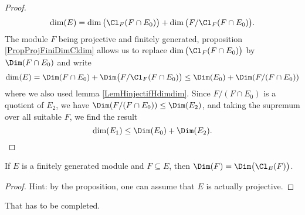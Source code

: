 \begin{proof}
\begin{equation}
	\dim(E)=\dim\big( \Cl_F(F\cap E_0) \big)+\dim\big( F/\Cl_F(F\cap E_0) \big).
\end{equation}
The module $F$ being projective and finitely generated, proposition \ref{PropProjFiniDimCldim} allows us to replace $\dim\big( \Cl_F(F\cap E_0) \big)$ by $\Dim(F\cap E_0)$ and write
\begin{equation}
	\dim(E)=\Dim(F\cap E_0)+\Dim\big( F/\Cl_F(F\cap E_0) \big)\leq \Dim(E_0)+\Dim(F/(F\cap E_0))
\end{equation}
where we also used lemma \ref{LemHinjectifHdimdim}. Since $F/(F\cap E_0)$ is a quotient of $E_2$, we have $\Dim(F/(F\cap E_0))\leq\Dim(E_2)$, and taking the supremum over all suitable $F$, we find the result
\begin{equation}
	\dim(E_1)\leq \Dim(E_0)+\Dim(E_2).
\end{equation}
\end{proof}

\begin{proposition}
If $E$ is a finitely generated module and $F\subseteq E$, then $\Dim(F)=\Dim\big(\Cl_E(F)\big)$.
\end{proposition}
\begin{proof}
Hint: by the proposition, one can assume that $E$ is actually projective.
\end{proof}
\begin{probleme}
 That has to be completed.
\end{probleme}
